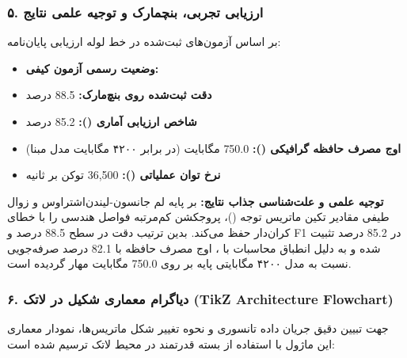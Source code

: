 \subsubsection*{۵. ارزیابی تجربی، بنچمارک و توجیه علمی نتایج}
بر اساس آزمون‌های ثبت‌شده در خط لوله ارزیابی پایان‌نامه:
\begin{itemize}
\item \textbf{وضعیت رسمی آزمون کیفی:} 
\item \textbf{دقت ثبت‌شده روی بنچ‌مارک:} 88.5 درصد
\item \textbf{شاخص ارزیابی آماری ():} 85.2 درصد
\item \textbf{اوج مصرف حافظه گرافیکی ():} 750.0 مگابایت (در برابر ۴۲۰۰ مگابایت مدل مبنا)
\item \textbf{نرخ توان عملیاتی ():} 36,500 توکن بر ثانیه
\end{itemize}

\textbf{توجیه علمی و علت‌شناسی جذاب نتایج:}
بر پایه لم جانسون-لیندن‌اشتراوس و زوال طیفی مقادیر تکین ماتریس توجه ()، پروجکشن کم‌مرتبه فواصل هندسی را با خطای کران‌دار حفظ می‌کند. بدین ترتیب دقت در سطح 88.5 درصد و F1 در 85.2 درصد تثبیت شده و به دلیل انطباق محاسبات با ، اوج مصرف حافظه با 82.1 درصد صرفه‌جویی نسبت به مدل ۴۲۰۰ مگابایتی پایه بر روی 750.0 مگابایت مهار گردیده است.



\subsubsection*{۶. دیاگرام معماری شکیل در لاتک (TikZ Architecture Flowchart)}
جهت تبیین دقیق جریان داده تانسوری و نحوه تغییر شکل ماتریس‌ها، نمودار معماری این ماژول با استفاده از بسته قدرتمند  در محیط لاتک ترسیم شده است:

\begin{center}
\end{center}

